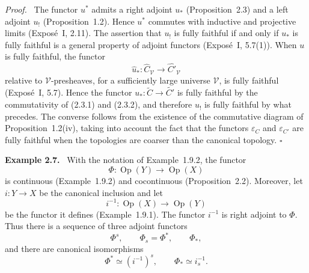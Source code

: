 \documentclass[11pt]{article}
\newcommand{\V}{\mathcal{V}}
\newcommand{\qedtext}{\hfill\(\square\)}
\newenvironment{remarktext}[1]{\par\medskip\noindent\textbf{#1.}\ }{\par\medskip}
\newenvironment{prooftext}{\par\noindent\emph{Proof.}\ }{\par\medskip}
\begin{document}
\begin{prooftext}
The functor \(u^*\) admits a right adjoint \(u_*\) (Proposition~2.3) and a left adjoint \(u_!\) (Proposition~1.2). Hence \(u^*\) commutes with inductive and projective limits (Expos\'e~I, 2.11). The assertion that \(u_!\) is fully faithful if and only if \(u_*\) is fully faithful is a general property of adjoint functors (Expos\'e~I, 5.7(1)). When \(u\) is fully faithful, the functor
\[
\widehat u_*:\widehat C_{\V}\longrightarrow\widehat {C'}_{\V}
\]
relative to \(\V\)-presheaves, for a sufficiently large universe \(\V\), is fully faithful (Expos\'e~I, 5.7). Hence the functor \(u_*:\widetilde C\to\widetilde {C'}\) is fully faithful by the commutativity of (2.3.1) and (2.3.2), and therefore \(u_!\) is fully faithful by what precedes. The converse follows from the existence of the commutative diagram of Proposition~1.2(iv), taking into account the fact that the functors \(\varepsilon_C\) and \(\varepsilon_{C'}\) are fully faithful when the topologies are coarser than the canonical topology. \qedtext
\end{prooftext}

\begin{remarktext}{Example 2.7}
With the notation of Example~1.9.2, the functor
\[
\Phi:\operatorname{Op}(Y)\longrightarrow\operatorname{Op}(X)
\]
is continuous (Example~1.9.2) and cocontinuous (Proposition~2.2). Moreover, let \(i:Y\to X\) be the canonical inclusion and let
\[
i^{-1}:\operatorname{Op}(X)\longrightarrow\operatorname{Op}(Y)
\]
be the functor it defines (Example~1.9.1). The functor \(i^{-1}\) is right adjoint to \(\Phi\). Thus there is a sequence of three adjoint functors
\[
\Phi^s,\qquad \Phi_s=\Phi^*,\qquad \Phi_*,
\]
and there are canonical isomorphisms
\[
\Phi^*\simeq (i^{-1})^s,
\qquad
\Phi_*\simeq i^{-1}_s.
\]
\end{remarktext}

\bigskip
\end{document}
